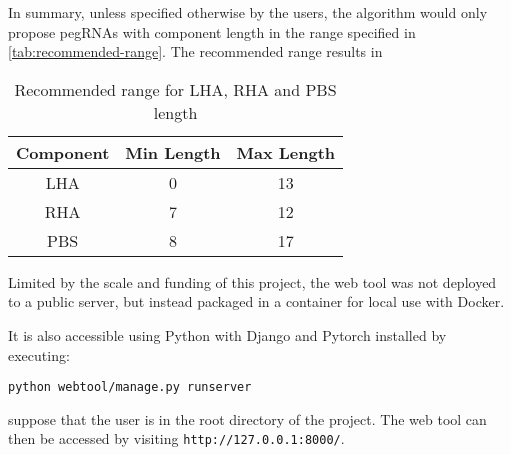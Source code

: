 In summary, unless specified otherwise by the users, the algorithm would only propose pegRNAs with component length in the range specified in \autoref{tab:recommended-range}. The recommended range results in

\begin{table}[h]
    \centering
    \begin{tabular}{c|c|c}
        \textbf{Component} & \textbf{Min Length} & \textbf{Max Length} \\
        \hline
        LHA & 0 & 13 \\
        RHA & 7 & 12 \\
        PBS & 8 & 17 \\
    \end{tabular}
    \caption{Recommended range for LHA, RHA and PBS length}
    \label{tab:recommended-range}
\end{table}


Limited by the scale and funding of this project, the web tool was not deployed to a public server, but instead packaged in a container for local use with Docker. 

It is also accessible using Python with Django and Pytorch installed by executing:

\verb|python webtool/manage.py runserver|

suppose that the user is in the root directory of the project. The web tool can then be accessed by visiting \verb|http://127.0.0.1:8000/|.